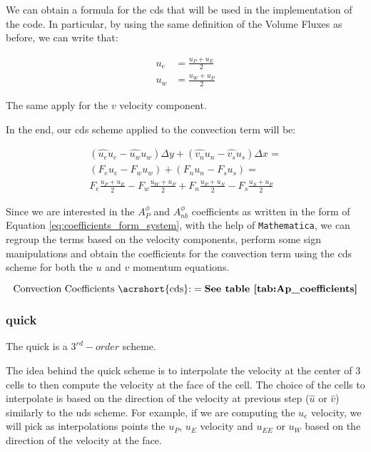 We can obtain a formula for the \acrshort{cds} that will be used in the implementation of the code.
In particular, by using the same definition of the Volume Fluxes as before, we can write that:

\begin{align}
    u_e & = \frac{u_P + u_E}{2} \\
    u_w & = \frac{u_W + u_P}{2}
\end{align}

The same apply for the $v$ velocity component.

In the end, our \acrshort{cds} scheme applied to the convection term will be:

\begin{gather*}
    \left(\hat{u_e}u_e - \hat{u_w}u_w\right) \Delta y + \left(\hat{v_n}u_n - \hat{v_s}u_s\right) \Delta x = \\
    \left(F_e u_e - F_w u_w\right) + \left(F_n u_n - F_s u_s\right) = \\
    F_e \frac{u_P + u_E}{2} - F_w \frac{u_W + u_P}{2} + F_n \frac{u_P + u_N}{2} - F_s \frac{u_S + u_P}{2}
\end{gather*}

Since we are interested in the $A_P^\phi$ and $A_{nb}^\phi$ coefficients as written in the form of Equation \ref{eq:coefficients_form_system}, with the help of \texttt{Mathematica}, we can regroup the terms based on the velocity components, perform some sign manipulations and obtain the coefficients for the convection term using the \acrshort{cds} scheme for both the $u$ and $v$ momentum equations.

\begin{equation*}
    \text{Convection Coefficients \acrshort{cds}:} = { \textbf{See table \ref{tab:Ap_coefficients}} }
\end{equation*}



%
%
\subsubsection{\acrfull{quick}}

The \acrfull{quick} is a $3^{rd}-order$ scheme.

The idea behind the \acrshort{quick} scheme is to interpolate the velocity at the center of 3 cells to then compute the velocity at the face of the cell.
The choice of the cells to interpolate is based on the direction of the velocity at previous step ($\hat{u}$ or $\hat{v}$) similarly to the \acrshort{uds} scheme.
For example, if we are computing the $u_e$ velocity, we will pick as interpolations points the $u_P$, $u_E$ velocity and $u_{EE}$ or $u_{W}$ based on the direction of the velocity at the face.

